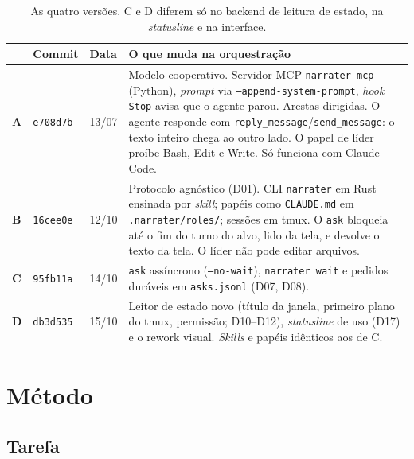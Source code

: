 \documentclass[11pt,a4paper]{article}
\newcommand{\versao}[1]{\textbf{#1}}
\begin{document}
\begin{table}[H]
\centering\small
\begin{tabularx}{\linewidth}{@{}l l l X@{}}
\toprule
& Commit & Data & O que muda na orquestração \\
\midrule
\versao{A} & \texttt{e708d7b} & 13/07 & Modelo cooperativo. Servidor MCP \texttt{narrater-mcp} (Python), \emph{prompt} via
  \texttt{--append-system-prompt}, \emph{hook} \texttt{Stop} avisa que o agente parou. Arestas dirigidas.
  O agente responde com \texttt{reply\_message}/\texttt{send\_message}: o texto inteiro chega ao outro lado.
  O papel de líder proíbe Bash, Edit e Write. Só funciona com Claude Code. \\
\versao{B} & \texttt{16cee0e} & 12/10 & Protocolo agnóstico (D01). CLI \texttt{narrater} em Rust ensinada por
  \emph{skill}; papéis como \texttt{CLAUDE.md} em \texttt{.narrater/roles/}; sessões em tmux. O \texttt{ask}
  bloqueia até o fim do turno do alvo, lido da tela, e devolve o texto da tela. O líder não pode editar arquivos. \\
\versao{C} & \texttt{95fb11a} & 14/10 & \texttt{ask} assíncrono (\texttt{--no-wait}), \texttt{narrater wait} e
  pedidos duráveis em \texttt{asks.jsonl} (D07, D08). \\
\versao{D} & \texttt{db3d535} & 15/10 & Leitor de estado novo (título da janela, primeiro plano do tmux, permissão;
  D10--D12), \emph{statusline} de uso (D17) e o rework visual. \emph{Skills} e papéis idênticos aos de C. \\
\bottomrule
\end{tabularx}
\caption{As quatro versões. C e D diferem só no backend de leitura de estado, na \emph{statusline} e na interface.}
\end{table}

\section{Método}

\subsection{Tarefa}
\end{document}
